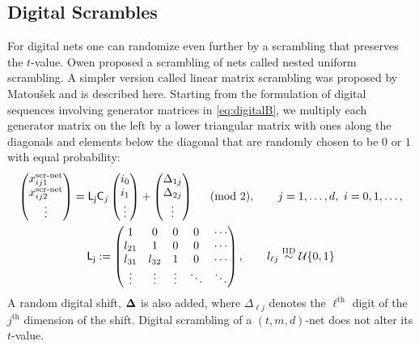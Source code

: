 \documentclass{svproc}
\begin{document}
\subsection{Digital Scrambles} \label{sec:scrambles}
For digital nets one can randomize even further by a scrambling that preserves the $t$-value.  Owen \cite{Owe95} proposed a scrambling of nets called nested uniform scrambling.  A simpler version called linear matrix scrambling was proposed by Matou\v{s}ek \cite{Mat98} and is described here.  Starting from the formulation of digital sequences involving generator matrices in \eqref{eq:digitalB}, we multiply each generator matrix on the left by a lower triangular matrix with ones along the diagonals and elements below the diagonal that are randomly chosen to be $0$ or $1$ with equal probability:
\begin{subequations} \label{eq:scr_lattice}
\begin{gather} \label{eq:digitalscr}
	\begin{pmatrix} x^{\text{scr-net}}_{ij1} \\ x^{\text{scr-net}}_{ij2} \\ \vdots \end{pmatrix}
	= \mathsf{L_j} \mathsf{C}_j \begin{pmatrix} i_0 \\ i_1 \\ \vdots \end{pmatrix} + \begin{pmatrix} \Delta_{1j} \\ \Delta_{2j} \\ \vdots \end{pmatrix} \quad \pmod{2}, \qquad j = 1,\ldots, d, \ i = 0, 1, \ldots, \\
	\mathsf{L_j} :=
	\begin{pmatrix}
		1 & 0 & 0 & 0 & \cdots \\
		l_{21} & 1 & 0 & 0 & \cdots \\
		l_{31} & l_{32} & 1 & 0 & \cdots \\
		\vdots & \vdots & \vdots & \ddots & \ddots
	\end{pmatrix}, \qquad l_{\ell j} \overset {\text{IID}}{\sim} {\mathcal{U}}\{0,1\}
\end{gather}
\end{subequations}
A random digital shift, ${\boldsymbol{\Delta}}$ is also added, where $\Delta_{\ell j}$ denotes the $\ell^{\text{th}}$ digit of the $j^{\text{th}}$ dimension of the shift.  Digital scrambling of a $(t,m,d)$-net does not alter its $t$-value.
\end{document}
